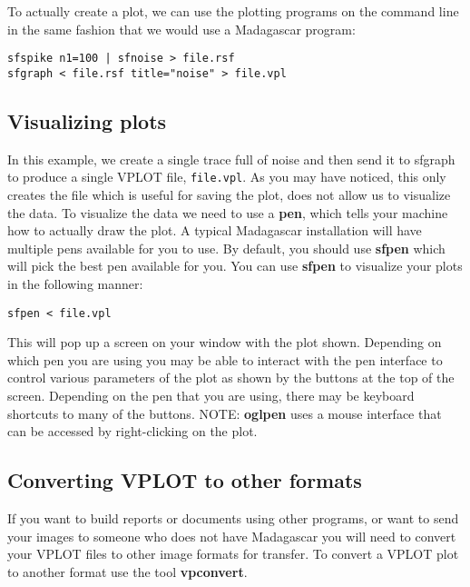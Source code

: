 To actually create a plot, we can use the plotting programs on the command line in the same fashion that we would use a Madagascar program:
\begin{verbatim}
sfspike n1=100 | sfnoise > file.rsf
sfgraph < file.rsf title="noise" > file.vpl
\end{verbatim}
\subsection{Visualizing plots}

In this example, we create a single trace full of noise and then send
it to sfgraph to produce a single VPLOT file, \texttt{file.vpl}.  As
you may have noticed, this only creates the file which is useful for
saving the plot, does not allow us to visualize the data.  To visualize
the data we need to use a \textbf{pen}, which tells your machine how
to actually draw the plot.  A typical Madagascar installation will
have multiple pens available for you to use.  By default, you should
use \textbf{sfpen} which will pick the best pen available for you.
You can use \textbf{sfpen} to visualize your plots in the following
manner:
\begin{verbatim}
sfpen < file.vpl
\end{verbatim}
This will pop up a screen on your window with the plot shown.  Depending on which pen you are using you may be able to interact with the pen interface to control various parameters of the plot as shown by the buttons at the top of the screen.  Depending on the pen that you are using, there may be keyboard shortcuts to many of the buttons.  NOTE: \textbf{oglpen} uses a mouse interface that can be accessed by right-clicking on the plot.

\subsection{Converting VPLOT to other formats}

If you want to build reports or documents using other programs, or want to send your images to someone who does not have Madagascar you will need to convert your VPLOT files to other image formats for transfer.    To convert a VPLOT plot to another format use the tool \textbf{vpconvert}.  

